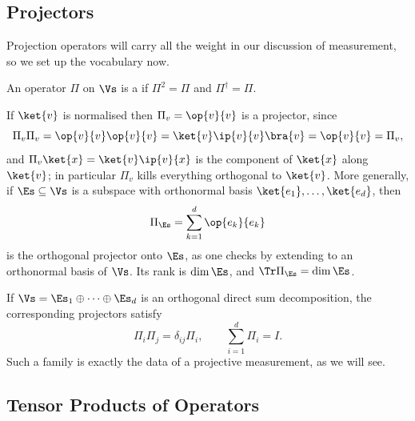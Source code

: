 \subsection{Projectors}

Projection operators will carry all the weight in our discussion of measurement, so we set up the vocabulary now.

\begin{definition}[Projector]
	An operator $\Pi$ on $\Vs$ is a  if $\Pi^2 = \Pi$ and $\Pi^\dagger = \Pi$.
\end{definition}

If $\ket{v}$ is normalised then $\Pi_v = \op{v}{v}$ is a projector, since
$$\Pi_v\Pi_v = \op{v}{v}\op{v}{v} = \ket{v}\ip{v}{v}\bra{v} = \op{v}{v} = \Pi_v,$$
and $\Pi_v \ket{x} = \ket{v}\ip{v}{x}$ is the component of $\ket{x}$ along $\ket{v}$; in particular $\Pi_v$ kills everything orthogonal to $\ket{v}$. More generally, if $\Es \subseteq \Vs$ is a subspace with orthonormal basis $\ket{e_1},\dots,\ket{e_d}$, then
$$\Pi_{\Es} = \sum_{k=1}^d \op{e_k}{e_k}$$
is the orthogonal projector onto $\Es$, as one checks by extending to an orthonormal basis of $\Vs$. Its rank is $\dim \Es$, and $\Tr \Pi_{\Es} = \dim\Es$.

If $\Vs = \Es_1 \oplus \cdots \oplus \Es_d$ is an orthogonal direct sum decomposition, the corresponding projectors satisfy
$$\Pi_i \Pi_j = \delta_{ij}\Pi_i, \qquad \sum_{i=1}^d \Pi_i = I.$$
Such a family is exactly the data of a projective measurement, as we will see.

\subsection{Tensor Products of Operators}\label{sec:tensorops}

